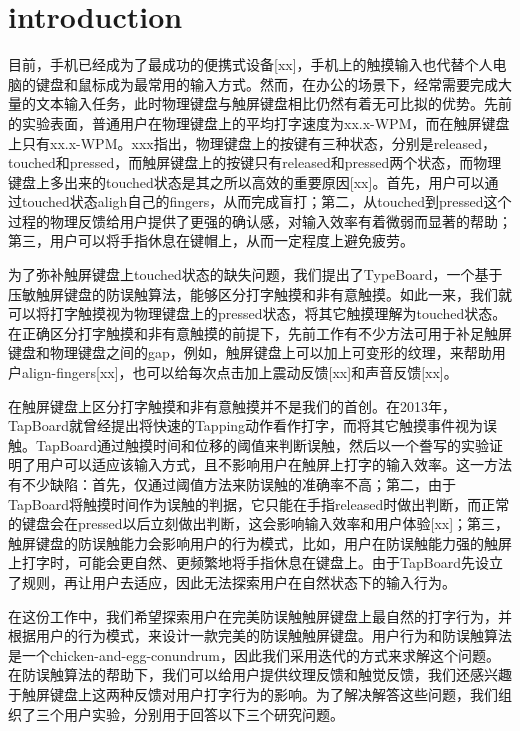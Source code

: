 \section{introduction}

目前，手机已经成为了最成功的便携式设备[xx]，手机上的触摸输入也代替个人电脑的键盘和鼠标成为最常用的输入方式。然而，在办公的场景下，经常需要完成大量的文本输入任务，此时物理键盘与触屏键盘相比仍然有着无可比拟的优势。先前的实验表面，普通用户在物理键盘上的平均打字速度为xx.x-WPM，而在触屏键盘上只有xx.x-WPM。xxx指出，物理键盘上的按键有三种状态，分别是released，touched和pressed，而触屏键盘上的按键只有released和pressed两个状态，而物理键盘上多出来的touched状态是其之所以高效的重要原因[xx]。首先，用户可以通过touched状态aligh自己的fingers，从而完成盲打；第二，从touched到pressed这个过程的物理反馈给用户提供了更强的确认感，对输入效率有着微弱而显著的帮助；第三，用户可以将手指休息在键帽上，从而一定程度上避免疲劳。

为了弥补触屏键盘上touched状态的缺失问题，我们提出了TypeBoard，一个基于压敏触屏键盘的防误触算法，能够区分打字触摸和非有意触摸。如此一来，我们就可以将打字触摸视为物理键盘上的pressed状态，将其它触摸理解为touched状态。在正确区分打字触摸和非有意触摸的前提下，先前工作有不少方法可用于补足触屏键盘和物理键盘之间的gap，例如，触屏键盘上可以加上可变形的纹理，来帮助用户align-fingers[xx]，也可以给每次点击加上震动反馈[xx]和声音反馈[xx]。

在触屏键盘上区分打字触摸和非有意触摸并不是我们的首创。在2013年，TapBoard就曾经提出将快速的Tapping动作看作打字，而将其它触摸事件视为误触。TapBoard通过触摸时间和位移的阈值来判断误触，然后以一个誊写的实验证明了用户可以适应该输入方式，且不影响用户在触屏上打字的输入效率。这一方法有不少缺陷：首先，仅通过阈值方法来防误触的准确率不高；第二，由于TapBoard将触摸时间作为误触的判据，它只能在手指released时做出判断，而正常的键盘会在pressed以后立刻做出判断，这会影响输入效率和用户体验[xx]；第三，触屏键盘的防误触能力会影响用户的行为模式，比如，用户在防误触能力强的触屏上打字时，可能会更自然、更频繁地将手指休息在键盘上。由于TapBoard先设立了规则，再让用户去适应，因此无法探索用户在自然状态下的输入行为。

在这份工作中，我们希望探索用户在完美防误触触屏键盘上最自然的打字行为，并根据用户的行为模式，来设计一款完美的防误触触屏键盘。用户行为和防误触算法是一个chicken-and-egg-conundrum，因此我们采用迭代的方式来求解这个问题。在防误触算法的帮助下，我们可以给用户提供纹理反馈和触觉反馈，我们还感兴趣于触屏键盘上这两种反馈对用户打字行为的影响。为了解决解答这些问题，我们组织了三个用户实验，分别用于回答以下三个研究问题。

